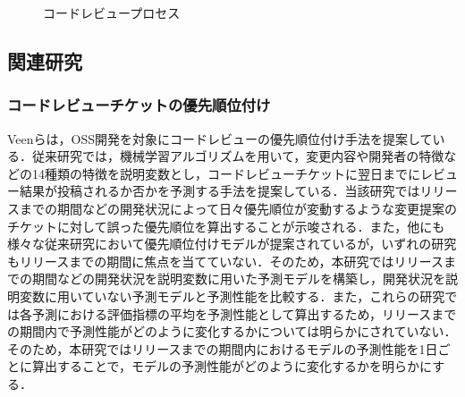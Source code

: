 \documentclass[submit]{ipsj}
\begin{document}
\begin{figure}[h]
\begin{center}
\caption{コードレビュープロセス}
\label{fig:codereviewprocess}
\end{center}
\end{figure}

\subsection{関連研究}
\subsubsection{コードレビューチケットの優先順位付け}
Veen\cite{prioritizer}らは，OSS開発を対象にコードレビューの優先順位付け手法を提案している．従来研究では，機械学習アルゴリズムを用いて，変更内容や開発者の特徴などの14種類の特徴を説明変数とし，コードレビューチケットに翌日までにレビュー結果が投稿されるか否かを予測する手法を提案している．当該研究ではリリースまでの期間などの開発状況によって日々優先順位が変動するような変更提案のチケットに対して誤った優先順位を算出することが示唆される．また，他にも様々な従来研究\cite{review_prioritize_pineapple}\cite{prioritize_azeem}\cite{prioritize_fan}において優先順位付けモデルが提案されているが，いずれの研究もリリースまでの期間に焦点を当てていない．そのため，本研究ではリリースまでの期間などの開発状況を説明変数に用いた予測モデルを構築し，開発状況を説明変数に用いていない予測モデルと予測性能を比較する．また，これらの研究\cite{prioritizer}\cite{review_prioritize_pineapple}\cite{prioritize_azeem}\cite{prioritize_fan}では各予測における評価指標の平均を予測性能として算出するため，リリースまでの期間内で予測性能がどのように変化するかについては明らかにされていない．そのため，本研究ではリリースまでの期間内におけるモデルの予測性能を1日ごとに算出することで，モデルの予測性能がどのように変化するかを明らかにする．
\end{document}
